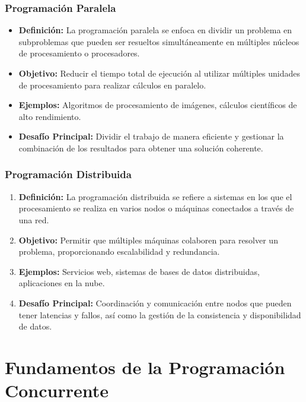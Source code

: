 \documentclass{beamer}
\begin{document}
\begin{frame}
  \frametitle{Programación Paralela}
  \begin{alertblock}
      

  \begin{itemize}
    \item \textbf{Definición:} La programación paralela se enfoca en dividir un problema en subproblemas que pueden ser resueltos simultáneamente en múltiples núcleos de procesamiento o procesadores.\pause
    \item \textbf{Objetivo:} Reducir el tiempo total de ejecución al utilizar múltiples unidades de procesamiento para realizar cálculos en paralelo.\pause
    \item \textbf{Ejemplos:} Algoritmos de procesamiento de imágenes, cálculos científicos de alto rendimiento.
    \item \textbf{Desafío Principal:} Dividir el trabajo de manera eficiente y gestionar la combinación de los resultados para obtener una solución coherente.
  \end{itemize}
  \end{alertblock}
\end{frame}

\begin{frame}
\begin{alertblock}
    

  \frametitle{Programación Distribuida}
  \begin{enumerate}
      
    \item \textbf{Definición:} La programación distribuida se refiere a sistemas en los que el procesamiento se realiza en varios nodos o máquinas conectados a través de una red.\pause
    \item \textbf{Objetivo:} Permitir que múltiples máquinas colaboren para resolver un problema, proporcionando escalabilidad y redundancia.\pause
    \item \textbf{Ejemplos:} Servicios web, sistemas de bases de datos distribuidas, aplicaciones en la nube.\pause
    \item \textbf{Desafío Principal:} Coordinación y comunicación entre nodos que pueden tener latencias y fallos, así como la gestión de la consistencia y disponibilidad de datos.
  \end{enumerate}
  \end{alertblock}
\end{frame}


\section{Fundamentos de la Programación Concurrente}
\end{document}
